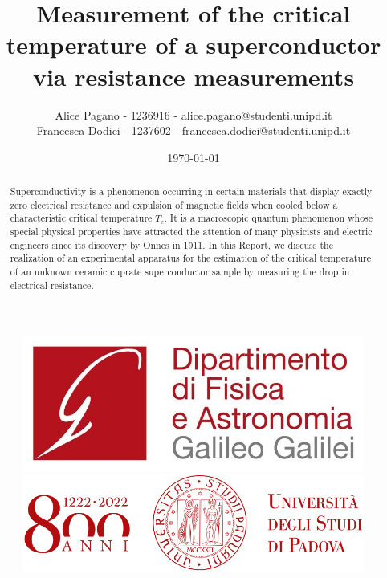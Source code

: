 \documentclass[rmp,10pt,onecolumn,fleqn,notitlepage]{revtex4-1}
\begin{document}

\begin{figure}[H]
\begin{minipage}{0.25\linewidth}
\includegraphics[width=\linewidth]{logo_DFA.jpg}
\end{minipage}
\hfill
\begin{minipage}{0.35\linewidth}
\includegraphics[width=\textwidth]{logo_800anni.png}
\end{minipage}
\end{figure}
\noindent\makebox[\linewidth]{\color{linescolor} \rule{0.85\paperwidth}{1.2 pt}}
\noindent\makebox[\linewidth]{\color{linescolor} \rule[0.3cm]{0.85\paperwidth}{1pt}}

\title{Measurement of the critical temperature of a superconductor via resistance measurements}
\author{Alice Pagano - 1236916 - alice.pagano@studenti.unipd.it \\ Francesca Dodici - 1237602 - francesca.dodici@studenti.unipd.it}
\date{\today}

\begin{abstract}

Superconductivity is a phenomenon occurring in certain materials that display exactly zero electrical resistance and expulsion of magnetic fields  when cooled below a characteristic critical temperature $T_c$. It is a macroscopic quantum phenomenon whose
special physical properties have attracted the attention of many physicists and electric engineers since its discovery by Onnes in 1911. 
In this Report, we discuss the realization of an experimental apparatus for the estimation of the critical temperature of an unknown ceramic cuprate superconductor sample by measuring the drop in electrical resistance.
\end{abstract}
\end{document}
